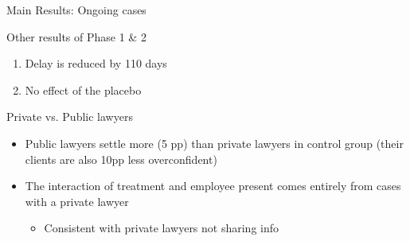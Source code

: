 \documentclass[9pt]{beamer}
\begin{document}
\begin{frame}{Main Results: Ongoing cases}
\begin{enumerate}
\begin{itemize}
	\hyperlink{frame_Table3C}{}
         \end{itemize}
    
    \label{frame_MR_d}
    \end{enumerate}
  \end{frame}
 
 
 
 \begin{frame}{Other results of Phase 1 \& 2}
     \label{otherresults}
     \begin{enumerate}
         \item Delay is reduced by 110 days
        \hyperlink{frameduration}{}
        \vspace{.1in}
        \item No effect of the placebo
     \end{enumerate}
     
 \end{frame}
 
 
 
 
 \begin{frame}{Private vs. Public lawyers}
 \begin{itemize}
     \item Public lawyers settle more (5 pp) than private lawyers in control group (their clients are also 10pp less overconfident)
     \pause
     \vspace{.1in}
     \item The interaction of treatment and employee present comes entirely from cases with a private lawyer
     \begin{itemize}
         \item Consistent with private lawyers not sharing info
     \end{itemize}
     \pause
 \end{itemize}
 
 \vspace{.1in}
     \begin{table}[H]
    \label{te_bylawyer}
    \begin{center}
     \scriptsize{}
    \end{center}
\end{table}
 \vspace{.2in} 
 \end{frame}
 
\end{document}
